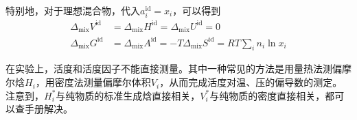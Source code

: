 \documentclass[main.tex]{subfiles}
\begin{document}
特别地，对于理想混合物，代入$a_i^\text{id}=x_i$，可以得到
\begin{align}
  \Delta_\text{mix}V^\text{id} & =\Delta_\text{mix}H^\text{id}=\Delta_\text{mix}U^\text{id}=0\label{eq:II.4_ideal_mixture_mixing_function_zero}                       \\
  \Delta_\text{mix}G^\text{id} & =\Delta_\text{mix}A^\text{id}=-T\Delta_\text{mix}S^\text{id}=RT\sum_in_i\ln x_i\label{eq:II.4_ideal_mixture_mixing_function_nonzero}
\end{align}

在实验上，活度和活度因子不能直接测量。其中一种常见的方法是用量热法测偏摩尔焓$H_i$\cite{Grolier2015}，用密度法测量偏摩尔体积$V_i$，从而完成活度对温、压的偏导数的测定。注意到，$H_i^*$与纯物质的标准生成焓直接相关，$V_i^*$与纯物质的密度直接相关，都可以查手册解决。
\end{document}
